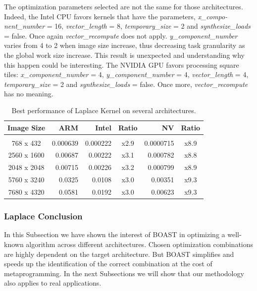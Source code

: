 \documentclass{IEEEtran}
\begin{document}
The optimization parameters selected are not the same for those architectures.
Indeed, the Intel CPU favors kernels that have the parameters,
\emph{x\_compo-nent\_number} = 16, \emph{vector\_length} = 8,
\emph{temporary\_size} = 2 and \emph{synthesize\_loads} = false. Once again
\emph{vector\_recompute} does not apply. \emph{y\_component\_number} varies
from 4 to 2 when image size increase, thus decreasing task granularity as the
global work size increase. This result is unexpected and understanding why this
happen could be interesting. The NVIDIA GPU favors processing square tiles:
\emph{x\_component\_number} = 4, \emph{y\_component\_number} = 4,
\emph{vector\_length} = 4, \emph{temporary\_size} = 2 and
\emph{synthesize\_loads} = false. Once more, \emph{vector\_recompute} has no
meaning.

\begin{table}
\caption{Best performance of Laplace Kernel on several architectures.}
\label{tbl:other}
\centering
\begin{tabular}{c|r|r|c|r|c}
  Image Size & ARM & Intel & Ratio & NV & Ratio \\[4pt]
  \hline&&&&\\[-8pt]
768 x 432   & 0.000639     & 0.000222    & x2.9  & 0.0000715    & x8.9  \\
2560 x 1600 & 0.00687      & 0.00222     & x3.1  & 0.000782     & x8.8  \\
2048 x 2048 & 0.00715      & 0.00226     & x3.2  & 0.000799     & x8.9  \\
5760 x 3240 & 0.0325       & 0.0108      & x3.0  & 0.00351      & x9.3  \\
7680 x 4320 & 0.0581       & 0.0192      & x3.0  & 0.00623      & x9.3  \\
\end{tabular}
\end{table}

\subsubsection{Laplace Conclusion}

In this Subsection we have shown the interest of BOAST in optimizing a
well-known algorithm across different architectures. Chosen optimization
combinations are highly dependent on the target architecture. But BOAST
simplifies and speeds up the identification of the correct combination at the
cost of metaprogramming. In the next Subsections we will show that our
methodology also applies to real applications.
\end{document}
